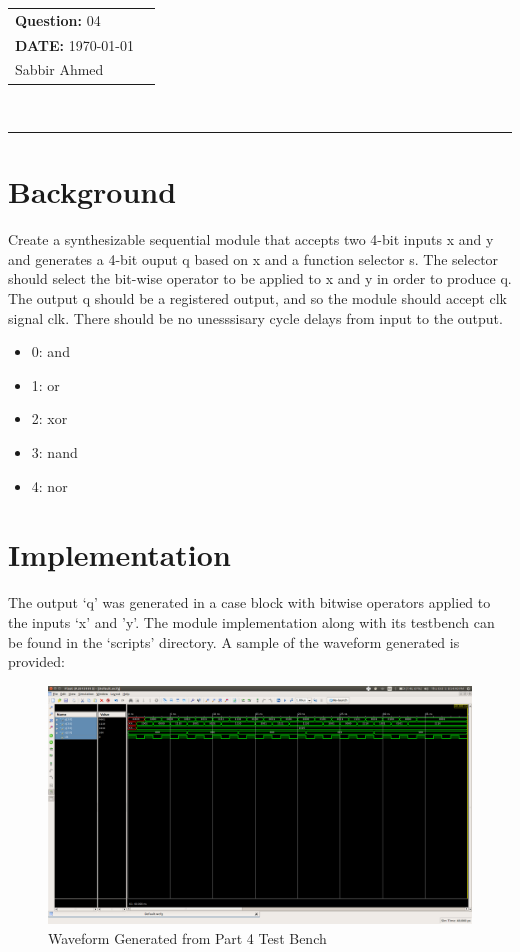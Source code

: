 \documentclass[paper=usletter, fontsize=12pt]{article}
\newcommand{\documentinfo}[3]{
    \begin{centering}
        \parbox{2in}{
        \begin{spacing}{1}
            \begin{flushleft}
                \begin{tabular}{l l}
                    #1 \\
                    #2 \\
                    #3 \\
                \end{tabular}\\
                \rule{\textwidth}{1pt}
            \end{flushleft}
        \end{spacing}
        }
    \end{centering}
}
\begin{document}
    \documentinfo{\textbf{Question:} 04}{\textbf{DATE:} \today}{Sabbir Ahmed}
    \vspace{-0.1in}

    \section{Background}
    Create a synthesizable sequential module that accepts two 4-bit inputs x and y and generates a 4-bit ouput q based on x and a function selector s. The selector should select the bit-wise operator to be applied to x and y in order to produce q. The output q should be a registered output, and so the module should accept clk signal clk. There should be no unesssisary cycle delays from input to the output.
    \begin{itemize}
        \item 0: and
        \item 1: or
        \item 2: xor
        \item 3: nand
        \item 4: nor
    \end{itemize}

    \section{Implementation}
    The output `q' was generated in a case block with bitwise operators applied to the inputs `x' and 'y'. The module implementation along with its testbench can be found in the `scripts' directory. A sample of the waveform generated is provided:

    \begin{figure}[ht]
        \begin{center}
            \includegraphics[width=1\textwidth]{wav.png}
            \caption{Waveform Generated from Part 4 Test Bench} \label{fig:wav}
        \end{center}
    \end{figure}
\end{document}
